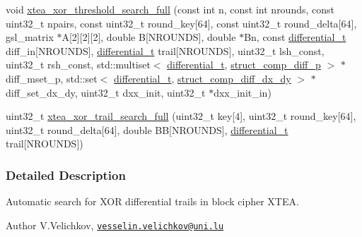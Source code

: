 \begin{DoxyCompactItemize}
\item 
void \hyperlink{xtea-xor-threshold-search_8cc_ac36a9286201c9538d7a164cd02ca2c65}{xtea\-\_\-xor\-\_\-threshold\-\_\-search\-\_\-full} (const int n, const int nrounds, const uint32\-\_\-t npairs, const uint32\-\_\-t round\-\_\-key\mbox{[}64\mbox{]}, const uint32\-\_\-t round\-\_\-delta\mbox{[}64\mbox{]}, gsl\-\_\-matrix $\ast$\-A\mbox{[}2\mbox{]}\mbox{[}2\mbox{]}\mbox{[}2\mbox{]}, double \-B\mbox{[}\-N\-R\-O\-U\-N\-D\-S\mbox{]}, double $\ast$\-Bn, const \hyperlink{structdifferential__t}{differential\-\_\-t} diff\-\_\-in\mbox{[}\-N\-R\-O\-U\-N\-D\-S\mbox{]}, \hyperlink{structdifferential__t}{differential\-\_\-t} trail\mbox{[}\-N\-R\-O\-U\-N\-D\-S\mbox{]}, uint32\-\_\-t lsh\-\_\-const, uint32\-\_\-t rsh\-\_\-const, std\-::multiset$<$ \hyperlink{structdifferential__t}{differential\-\_\-t}, \hyperlink{structstruct__comp__diff__p}{struct\-\_\-comp\-\_\-diff\-\_\-p} $>$ $\ast$diff\-\_\-mset\-\_\-p, std\-::set$<$ \hyperlink{structdifferential__t}{differential\-\_\-t}, \hyperlink{structstruct__comp__diff__dx__dy}{struct\-\_\-comp\-\_\-diff\-\_\-dx\-\_\-dy} $>$ $\ast$diff\-\_\-set\-\_\-dx\-\_\-dy, uint32\-\_\-t dxx\-\_\-init, uint32\-\_\-t $\ast$dxx\-\_\-init\-\_\-in)
\item 
uint32\-\_\-t \hyperlink{xtea-xor-threshold-search_8cc_a85aae29867c82160c8871fa17a34e5bb}{xtea\-\_\-xor\-\_\-trail\-\_\-search\-\_\-full} (uint32\-\_\-t key\mbox{[}4\mbox{]}, uint32\-\_\-t round\-\_\-key\mbox{[}64\mbox{]}, uint32\-\_\-t round\-\_\-delta\mbox{[}64\mbox{]}, double \-B\-B\mbox{[}\-N\-R\-O\-U\-N\-D\-S\mbox{]}, \hyperlink{structdifferential__t}{differential\-\_\-t} trail\mbox{[}\-N\-R\-O\-U\-N\-D\-S\mbox{]})
\end{DoxyCompactItemize}


\subsubsection{\-Detailed \-Description}
\-Automatic search for \-X\-O\-R differential trails in block cipher \-X\-T\-E\-A. \begin{DoxyAuthor}{\-Author}
\-V.\-Velichkov, \href{mailto:vesselin.velichkov@uni.lu}{\tt vesselin.\-velichkov@uni.\-lu} 
\end{DoxyAuthor}


